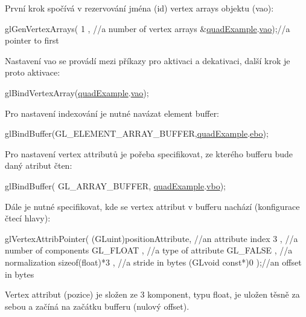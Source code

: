 První krok spočívá v rezervování jména (id) vertex arrays objektu (vao)\-: 
\begin{DoxyCodeInclude}
  glGenVertexArrays(
      1               , \textcolor{comment}{//a number of vertex arrays}
      &\hyperlink{quadExample_8c_ad961415145a9c30bd9846d4a278cc63a}{quadExample}.\hyperlink{structQuadExampleVariables_a294c388653d62435d7eeb7994f45c4fc}{vao});\textcolor{comment}{//a pointer to first }
\end{DoxyCodeInclude}
Nastavení vao se provádí mezi příkazy pro aktivaci a dekativaci, další krok je proto aktivace\-: 
\begin{DoxyCodeInclude}
  glBindVertexArray(\hyperlink{quadExample_8c_ad961415145a9c30bd9846d4a278cc63a}{quadExample}.\hyperlink{structQuadExampleVariables_a294c388653d62435d7eeb7994f45c4fc}{vao});
\end{DoxyCodeInclude}
Pro nastavení indexování je nutné navázat element buffer\-: 
\begin{DoxyCodeInclude}
  glBindBuffer(GL\_ELEMENT\_ARRAY\_BUFFER,\hyperlink{quadExample_8c_ad961415145a9c30bd9846d4a278cc63a}{quadExample}.\hyperlink{structQuadExampleVariables_a3b1abdb0f18593a0ebec8dd9a222164b}{ebo});
\end{DoxyCodeInclude}
Pro nastavení vertex attributů je pořeba specifikovat, ze kterého bufferu bude daný atribut čten\-: 
\begin{DoxyCodeInclude}
  glBindBuffer(
      GL\_ARRAY\_BUFFER,
      \hyperlink{quadExample_8c_ad961415145a9c30bd9846d4a278cc63a}{quadExample}.\hyperlink{structQuadExampleVariables_a69515fd546272c117e14f784221f6412}{vbo});
\end{DoxyCodeInclude}
Dále je nutné specifikovat, kde se vertex attribut v bufferu nachází (konfigurace čtecí hlavy)\-: 
\begin{DoxyCodeInclude}
  glVertexAttribPointer(
      (GLuint)positionAttribute, \textcolor{comment}{//an attribute index}
      3                        , \textcolor{comment}{//a number of components}
      GL\_FLOAT                 , \textcolor{comment}{//a type of attribute}
      GL\_FALSE                 , \textcolor{comment}{//a normalization}
      \textcolor{keyword}{sizeof}(\textcolor{keywordtype}{float})*3          , \textcolor{comment}{//a stride in bytes}
      (GLvoid \textcolor{keyword}{const}*)0         );\textcolor{comment}{//an offset in bytes}
\end{DoxyCodeInclude}
Vertex attribut (pozice) je složen ze 3 komponent, typu float, je uložen těsně za sebou a začíná na začátku bufferu (nulový offset).\par
